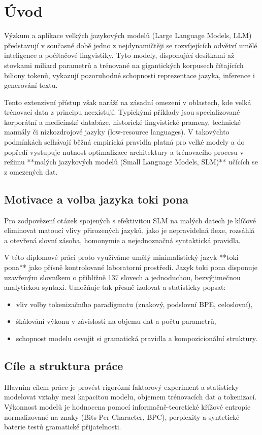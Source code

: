 \chapter{Úvod}
\label{chap:uvod}

Výzkum a aplikace velkých jazykových modelů (Large Language Models, LLM) představují v současné době jedno z nejdynamičtěji se rozvíjejících odvětví umělé inteligence a počítačové lingvistiky. Tyto modely, disponující desítkami až stovkami miliard parametrů a trénované na gigantických korpusech čítajících biliony tokenů, vykazují pozoruhodné schopnosti reprezentace jazyka, inference i generování textu.

Tento extenzivní přístup však naráží na zásadní omezení v oblastech, kde velká trénovací data z principu neexistují. Typickými příklady jsou specializované korporátní a medicínské databáze, historické lingvistické prameny, technické manuály či nízkozdrojové jazyky (low-resource languages). V takovýchto podmínkách selhávají běžná empirická pravidla platná pro velké modely a do popředí vystupuje nutnost optimalizace architektury a trénovacího procesu v režimu **malých jazykových modelů (Small Language Models, SLM)** učících se z omezených dat.

\section{Motivace a volba jazyka toki pona}
Pro zodpovězení otázek spojených s efektivitou SLM na malých datech je klíčové eliminovat matoucí vlivy přirozených jazyků, jako je nepravidelná flexe, rozsáhlá a otevřená slovní zásoba, homonymie a nejednoznačná syntaktická pravidla. 

V této diplomové práci proto využíváme umělý minimalistický jazyk **toki pona** \cite{lang2014toki} jako přísně kontrolované laboratorní prostředí. Jazyk toki pona disponuje uzavřeným slovníkem o přibližně 137 slovech a jednoduchou, bezvýjimečnou analytickou syntaxí. Umožňuje tak přesně izolovat a statisticky popsat:
\begin{itemize}
    \item vliv volby tokenizačního paradigmatu (znakový, podslovní BPE, celoslovní),
    \item škálování výkonu v závislosti na objemu dat a počtu parametrů,
    \item schopnost modelu osvojit si gramatická pravidla a kompozicionální struktury.
\end{itemize}

\section{Cíle a struktura práce}
Hlavním cílem práce je provést rigorózní faktorový experiment a statisticky modelovat vztahy mezi kapacitou modelu, objemem trénovacích dat a tokenizací. Výkonnost modelů je hodnocena pomocí informačně-teoretické křížové entropie normalizované na znaky (Bits-Per-Character, BPC), perplexity a syntetické baterie testů gramatické přijatelnosti.

